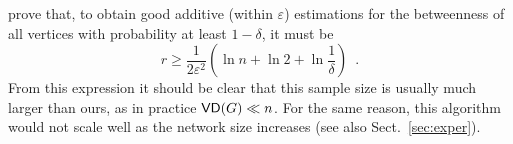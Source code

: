 prove that, to obtain good additive (within $\varepsilon$) estimations for the
betweenness of all vertices with probability at least $1-\delta$, it must be
\[
r\geq \frac{1}{2\varepsilon^2}\left(\ln n + \ln 2 +\ln\frac{1}{\delta}\right)\enspace.
\]
From this expression it should be clear that this sample size is usually much
larger than ours, as in practice $\mathsf{VD}(G)\ll n$. For the same reason, this
algorithm would not scale well as the network size increases (see also
Sect.~\ref{sec:exper}).

